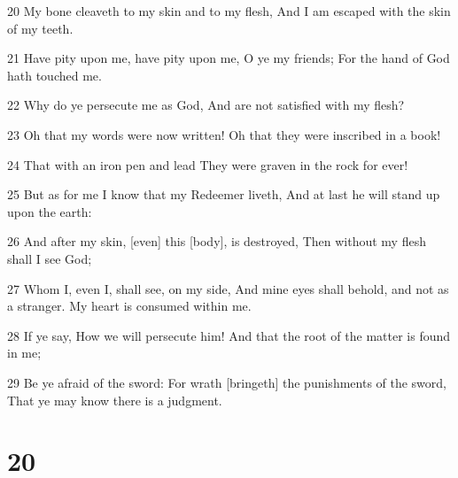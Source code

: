 \par 20 My bone cleaveth to my skin and to my flesh, And I am escaped with the skin of my teeth.
\par 21 Have pity upon me, have pity upon me, O ye my friends; For the hand of God hath touched me.
\par 22 Why do ye persecute me as God, And are not satisfied with my flesh?
\par 23 Oh that my words were now written! Oh that they were inscribed in a book!
\par 24 That with an iron pen and lead They were graven in the rock for ever!
\par 25 But as for me I know that my Redeemer liveth, And at last he will stand up upon the earth:
\par 26 And after my skin, [even] this [body], is destroyed, Then without my flesh shall I see God;
\par 27 Whom I, even I, shall see, on my side, And mine eyes shall behold, and not as a stranger. My heart is consumed within me.
\par 28 If ye say, How we will persecute him! And that the root of the matter is found in me;
\par 29 Be ye afraid of the sword: For wrath [bringeth] the punishments of the sword, That ye may know there is a judgment.

\chapter{20}

